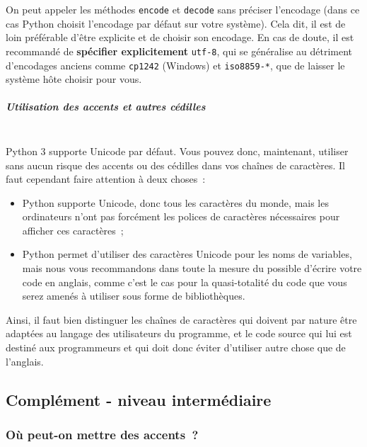     On peut appeler les méthodes \texttt{encode} et \texttt{decode} sans
préciser l'encodage (dans ce cas Python choisit l'encodage par défaut
sur votre système). Cela dit, il est de loin préférable d'être explicite
et de choisir son encodage. En cas de doute, il est recommandé de
\textbf{spécifier explicitement} \texttt{utf-8}, qui se généralise au
détriment d'encodages anciens comme \texttt{cp1242} (Windows) et
\texttt{iso8859-*}, que de laisser le système hôte choisir pour vous.

    \hypertarget{utilisation-des-accents-et-autres-cuxe9dilles}{%
\subparagraph{Utilisation des accents et autres
cédilles\\\\}\label{utilisation-des-accents-et-autres-cuxe9dilles}}

    Python 3 supporte Unicode par défaut. Vous pouvez donc, maintenant,
utiliser sans aucun risque des accents ou des cédilles dans vos chaînes
de caractères. Il faut cependant faire attention à deux choses~:

\begin{itemize}
	\item
	Python supporte Unicode, donc tous les caractères du monde, mais les
	ordinateurs n'ont pas forcément les polices de caractères nécessaires
	pour afficher ces caractères~;
	\item
	Python permet d'utiliser des caractères
	Unicode pour les noms de variables, mais nous vous recommandons dans
	toute la mesure du possible d'écrire votre code en anglais, comme c'est
	le cas pour la quasi-totalité du code que vous serez amenés à utiliser
	sous forme de bibliothèques.
\end{itemize}

Ainsi, il faut bien distinguer les chaînes de caractères qui doivent par
nature être adaptées au langage des utilisateurs du programme, et le
code source qui lui est destiné aux programmeurs et qui doit donc éviter
d'utiliser autre chose que de l'anglais.

    \hypertarget{compluxe9ment---niveau-intermuxe9diaire}{%
\subsection{Complément - niveau
intermédiaire}\label{compluxe9ment---niveau-intermuxe9diaire}}

    \hypertarget{ouxf9-peut-on-mettre-des-accents}{%
\subsubsection{Où peut-on mettre des
accents~?}\label{ouxf9-peut-on-mettre-des-accents}}

